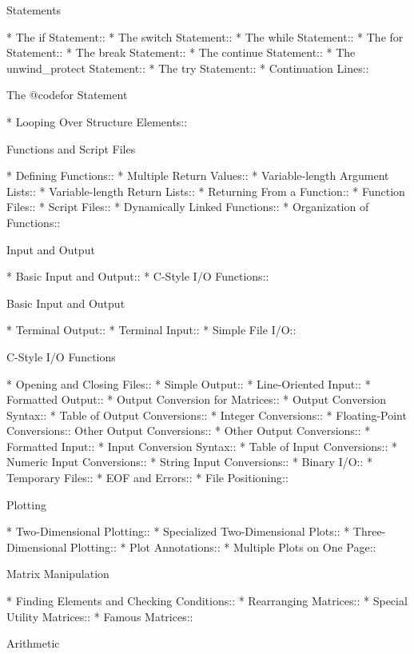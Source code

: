 Statements

* The if Statement::            
* The switch Statement::        
* The while Statement::         
* The for Statement::           
* The break Statement::         
* The continue Statement::      
* The unwind_protect Statement::  
* The try Statement::           
* Continuation Lines::          

The @code{for} Statement

* Looping Over Structure Elements::  

Functions and Script Files

* Defining Functions::          
* Multiple Return Values::      
* Variable-length Argument Lists::  
* Variable-length Return Lists::  
* Returning From a Function::   
* Function Files::              
* Script Files::                
* Dynamically Linked Functions::  
* Organization of Functions::   

Input and Output

* Basic Input and Output::      
* C-Style I/O Functions::       

Basic Input and Output

* Terminal Output::             
* Terminal Input::              
* Simple File I/O::             

C-Style I/O Functions

* Opening and Closing Files::   
* Simple Output::               
* Line-Oriented Input::         
* Formatted Output::            
* Output Conversion for Matrices::  
* Output Conversion Syntax::    
* Table of Output Conversions::  
* Integer Conversions::         
* Floating-Point Conversions::  Other Output Conversions::    
* Other Output Conversions::    
* Formatted Input::             
* Input Conversion Syntax::     
* Table of Input Conversions::  
* Numeric Input Conversions::   
* String Input Conversions::    
* Binary I/O::                  
* Temporary Files::             
* EOF and Errors::              
* File Positioning::            

Plotting

* Two-Dimensional Plotting::    
* Specialized Two-Dimensional Plots::  
* Three-Dimensional Plotting::  
* Plot Annotations::            
* Multiple Plots on One Page::  

Matrix Manipulation

* Finding Elements and Checking Conditions::  
* Rearranging Matrices::        
* Special Utility Matrices::    
* Famous Matrices::             

Arithmetic

